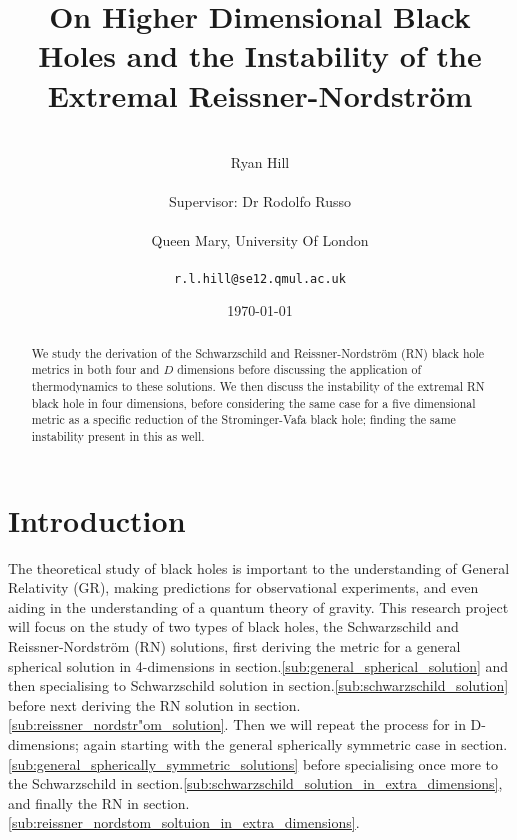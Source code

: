 \documentclass[12pt]{article}
\numberwithin{equation}{section}
\numberwithin{figure}{section}
\begin{document}
\renewcommand\citeform[1]{[#1]}

\title{On Higher Dimensional Black Holes and the Instability of the Extremal Reissner-Nordstr\"om}
\author{\\Ryan Hill \\\\
Supervisor: Dr Rodolfo Russo\\\\
Queen Mary, University Of London\\\\
\texttt{r.l.hill@se12.qmul.ac.uk}}
\date{\today}
\maketitle
\thispagestyle{empty}
%
%
\graphicspath{{images/}}
%
\begin{abstract}
We study the derivation of the Schwarzschild and Reissner-Nordstr\"om (RN) black hole metrics in both four and $D$ dimensions before discussing the application of thermodynamics to these solutions. We then discuss the instability of the extremal RN black hole in four dimensions, before considering the same case for a five dimensional metric as a specific reduction of the Strominger-Vafa black hole; finding the same instability present in this as well. 
\end{abstract}
%
\clearpage
%
{\hypersetup{linkcolor=black}
\tableofcontents}
\thispagestyle{empty}
%
\clearpage
%
\setcounter{page}{1}
\section{Introduction}
The theoretical study of black holes is important to the understanding of General Relativity (GR), making predictions for observational experiments, and even aiding in the understanding of a quantum theory of gravity. This research project will focus on the study of two types of black holes, the Schwarzschild and Reissner-Nordstr\"om (RN) solutions, first deriving the metric for a general spherical solution in 4-dimensions in section.\ref{sub:general_spherical_solution} and then specialising to Schwarzschild solution in section.\ref{sub:schwarzschild_solution} before next deriving the RN solution in section.\ref{sub:reissner_nordstr"om_solution}. Then we will repeat the process for in D-dimensions; again starting with the general spherically symmetric case in section.\ref{sub:general_spherically_symmetric_solutions} before specialising once more to the Schwarzschild in section.\ref{sub:schwarzschild_solution_in_extra_dimensions}, and finally the RN in section.\ref{sub:reissner_nordstom_soltuion_in_extra_dimensions}. 
\end{document}
